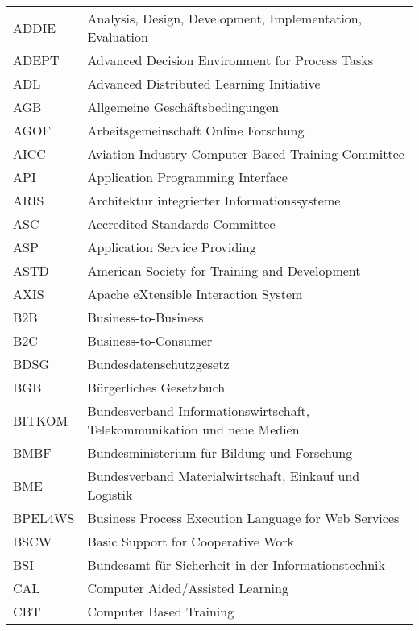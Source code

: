 \begin{longtable}[ht]{ll}
ADDIE & Analysis, Design, Development, Implementation, Evaluation\\  %
ADEPT & Advanced Decision Environment for Process Tasks\\  %
ADL & Advanced Distributed Learning Initiative\\  %
AGB & Allgemeine Geschäftsbedingungen\\  %
AGOF & Arbeitsgemeinschaft Online Forschung\\  %
AICC & Aviation Industry Computer Based Training Committee\\  %
API & Application Programming Interface\\  %
ARIS & Architektur integrierter Informationssysteme\\  %
ASC & Accredited Standards Committee\\  %
ASP & Application Service Providing\\  %
ASTD & American Society for Training and Development\\  %
AXIS & Apache eXtensible Interaction System\\  %
B2B & Business-to-Business\\  %
B2C & Business-to-Consumer\\  %
BDSG & Bundesdatenschutzgesetz\\  %
BGB & Bürgerliches Gesetzbuch\\  %
BITKOM & Bundesverband Informationswirtschaft, Telekommunikation und neue Medien\\  %
BMBF & Bundesministerium für Bildung und Forschung\\  %
BME & Bundesverband Materialwirtschaft, Einkauf und Logistik\\  %
BPEL4WS & Business Process Execution Language for Web Services\\  %
BSCW & Basic Support for Cooperative Work\\  %
BSI & Bundesamt für Sicherheit in der Informationstechnik\\ %
CAL & Computer Aided/Assisted Learning\\  %
CBT & Computer Based Training\\  %

\end{longtable}
